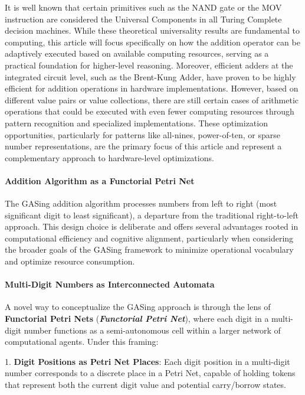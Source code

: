 It is well known that certain primitives such as the NAND gate or the MOV instruction are considered the Universal Components in all Turing Complete decision machines. While these theoretical universality results are fundamental to computing, this article will focus specifically on how the addition operator can be adaptively executed based on available computing resources, serving as a practical foundation for higher-level reasoning. Moreover, efficient adders at the integrated circuit level, such as the Brent-Kung Adder, have proven to be highly efficient for addition operations in hardware implementations. However, based on different value pairs or value collections, there are still certain cases of arithmetic operations that could be executed with even fewer computing resources through pattern recognition and specialized implementations. These optimization opportunities, particularly for patterns like all-nines, power-of-ten, or sparse number representations, are the primary focus of this article and represent a complementary approach to hardware-level optimizations.
\paragraph{Addition Algorithm as a Functorial Petri Net}

The GASing addition algorithm processes numbers from left to right (most significant digit to least significant), a departure from the traditional right-to-left approach. This design choice is deliberate and offers several advantages rooted in computational efficiency and cognitive alignment, particularly when considering the broader goals of the GASing framework to minimize operational vocabulary and optimize resource consumption.
\paragraph{Multi-Digit Numbers as Interconnected Automata}

A novel way to conceptualize the GASing approach is through the lens of \textbf{Functorial Petri Nets} (\textbf{\textit{Functorial Petri Net}}), where each digit in a multi-digit number functions as a semi-autonomous cell within a larger network of computational agents. Under this framing:

1. \textbf{Digit Positions as Petri Net Places}: Each digit position in a multi-digit number corresponds to a discrete place in a Petri Net, capable of holding tokens that represent both the current digit value and potential carry/borrow states.

